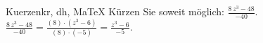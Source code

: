 \begin{MAufgabe}{Kuerzen}{kr, dh, MaTeX}
K\"urzen Sie soweit m\"oglich: $\frac{8\, z^3 - 48}{-40}$.\\ 
\ifLsg\MLoesung
\quad $\frac{8\, z^3 - 48}{-40}=\frac{(8)\cdot(z^3 - 6)}{(8)\cdot(-5)}=\frac{z^3 - 6}{-5}$.\else\relax\fi
 \end{MAufgabe}